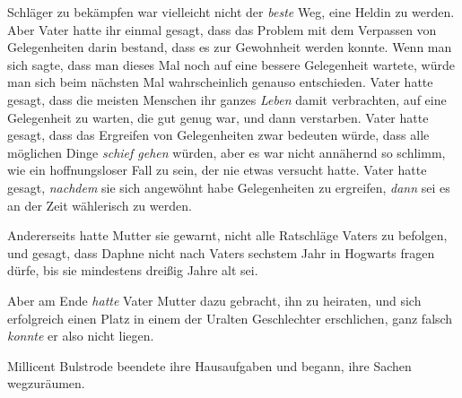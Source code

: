 Schläger zu bekämpfen war vielleicht nicht der \emph{beste} Weg, eine Heldin zu werden. Aber Vater hatte ihr einmal gesagt, dass das Problem mit dem Verpassen von Gelegenheiten darin bestand, dass es zur Gewohnheit werden konnte. Wenn man sich sagte, dass man dieses Mal noch auf eine bessere Gelegenheit wartete, würde man sich beim nächsten Mal wahrscheinlich genauso entschieden. Vater hatte gesagt, dass die meisten Menschen ihr ganzes \emph{Leben} damit verbrachten, auf eine Gelegenheit zu warten, die gut genug war, und dann verstarben. Vater hatte gesagt, dass das Ergreifen von Gelegenheiten zwar bedeuten würde, dass alle möglichen Dinge \emph{schief gehen} würden, aber es war nicht annähernd so schlimm, wie ein hoffnungsloser Fall zu sein, der nie etwas versucht hatte. Vater hatte gesagt, \emph{nachdem} sie sich angewöhnt habe Gelegenheiten zu ergreifen, \emph{dann} sei es an der Zeit wählerisch zu werden.

Andererseits hatte Mutter sie gewarnt, nicht alle Ratschläge Vaters zu befolgen, und gesagt, dass Daphne nicht nach Vaters sechstem Jahr in Hogwarts fragen dürfe, bis sie mindestens dreißig Jahre alt sei.

Aber am Ende \emph{hatte} Vater Mutter dazu gebracht, ihn zu heiraten, und sich erfolgreich einen Platz in einem der Uralten Geschlechter erschlichen, ganz falsch \emph{konnte} er also nicht liegen.

Millicent Bulstrode beendete ihre Hausaufgaben und begann, ihre Sachen wegzuräumen.

